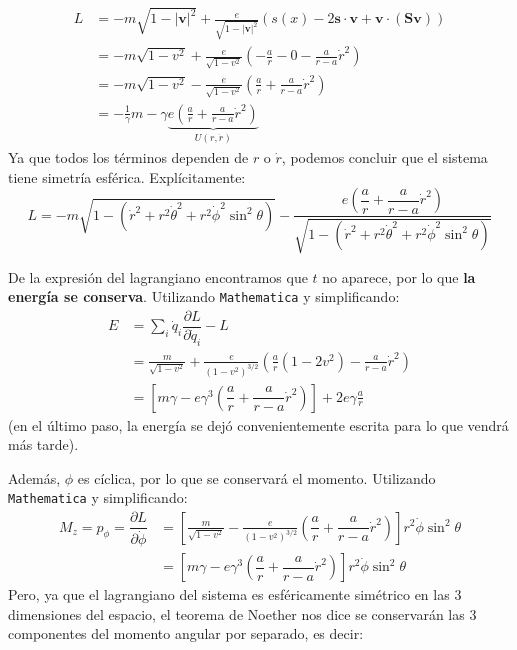\documentclass[]{article}
\numberwithin{equation}{section}
\newcommand{\0}{\textcolor{gray}{0}}
\newcommand{\pd}[2]{\dfrac{\partial #1}{\partial #2}}
\newcommand{\n}[1]{\mathbf{#1}}
\begin{document}
\begin{enumerate}
\begin{enumerate}
		\begin{align}
			L &= - m \sqrt{1 - |\n{v}|^2} + \frac{e}{\sqrt{1 - |\n{v}|^2}} \left(s(x) - 2 \n{s}\cdot\n{v} + \n{v} \cdot \left(\n{S} \n{v}\right) \right) \nonumber\\
			&= - m \sqrt{1 - v^2} + \frac{e}{\sqrt{1 - v^2}} \left(-\frac{a}{r} - 0 - \frac{a}{r - a}\dot{r}^2\right)\nonumber\\
			&= - m \sqrt{1 - v^2} - \frac{e}{\sqrt{1 - v^2}} \left(\frac{a}{r} + \frac{a}{r - a}\dot{r}^2\right)\nonumber\\
			&= - \frac{1}{\gamma} m - \gamma \underbrace{e \left(\frac{a}{r} + \frac{a}{r - a}\dot{r}^2\right)}_{U(r,\dot{r})}
		\end{align}
		Ya que todos los términos dependen de \(r\) o \(\dot{r}\), podemos concluir que el sistema tiene simetría esférica. Explícitamente:
		\begin{equation}
			L = - m \sqrt{1 - \left(\dot{r}^2 + r^2\dot{\theta}^2 + r^2 \dot{\phi}^2 \sin^2\theta \right)} - \frac{e \left(\dfrac{a}{r} + \dfrac{a}{r - a}\dot{r}^2\right)}{\sqrt{1 - \left(\dot{r}^2 + r^2\dot{\theta}^2 + r^2 \dot{\phi}^2 \sin^2\theta \right)}}
		\end{equation}
		
		De la expresión del lagrangiano encontramos que \(t\) no aparece, por lo que \textbf{la energía se conserva}. Utilizando \texttt{Mathematica} y simplificando:
		\begin{align}
			E &= \sum_i \dot{q}_i \pd{L}{\dot{q}_i} - L \nonumber\\
			&= \frac{m}{\sqrt{1 - v^2}} + \frac{e}{\left(1 - v^2\right)^{3/2}} \left(\frac{a}{r} \left(1 - 2 v^2\right) - \frac{a}{r - a} \dot{r}^2 \right)\nonumber\\
			&= \left[m \gamma - e \gamma^3 \left(\dfrac{a}{r} + \dfrac{a}{r - a}\dot{r}^2\right)\right] + 2 e \gamma \frac{a}{r}
		\end{align}
		(en el último paso, la energía se dejó convenientemente escrita para lo que vendrá más tarde).
		
		Además, \(\phi\) es cíclica, por lo que se conservará el momento. Utilizando \texttt{Mathematica} y simplificando:
		\begin{align}
			M_z = p_\phi = \pd{L}{\dot{\phi}} &= \left[\frac{m}{\sqrt{1 - v^2}} - \frac{e}{\left(1 - v^2\right)^{3/2}} \left(\dfrac{a}{r} + \dfrac{a}{r - a}\dot{r}^2\right) \right] r^2 \dot{\phi} \sin^2\theta\nonumber\\
			&= \left[m \gamma - e \gamma^3 \left(\dfrac{a}{r} + \dfrac{a}{r - a}\dot{r}^2\right) \right] r^2 \dot{\phi} \sin^2\theta \label{Mz}
		\end{align}
		Pero, ya que el lagrangiano del sistema es esféricamente simétrico en las 3 dimensiones del espacio, el teorema de Noether nos dice se conservarán las 3 componentes del momento angular por separado, es decir:
		

\end{enumerate}
\end{enumerate}
\end{document}
